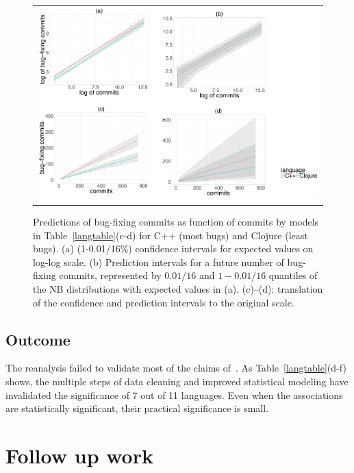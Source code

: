 \documentclass[acmsmall]{acmart}
\begin{document}
\begin{figure}[!h]\begin{center}\begin{tabular}{c}
\includegraphics[width=1\textwidth]{./Pictures/intervals.pdf}
\end{tabular}\end{center}\vspace{-6mm}
\caption{Predictions of bug-fixing commits as function of commits by models
  in Table~\ref{langtable}(c-d) for {C++} (most bugs) and {Clojure} (least
  bugs). (a) (1-0.01/16\%) confidence intervals for expected values on
  log-log scale. (b) Prediction intervals for a future number of bug-fixing
  commits, represented by $0.01/16$ and $1-0.01/16$ quantiles of the NB
  distributions with expected values in (a). (c)--(d): translation of the
  confidence and prediction intervals to the original
  scale.}\label{prediction}
\end{figure}

\subsection{Outcome}

The reanalysis failed to validate most of the claims of~\cite{ray14}.  As
Table~\ref{langtable}(d-f) shows, the multiple steps of data cleaning and
improved statistical modeling have invalidated the significance of 7 out of
11 languages. Even when the associations are statistically significant,
their practical significance is small.

\section{Follow up work}\label{threats}
\end{document}
